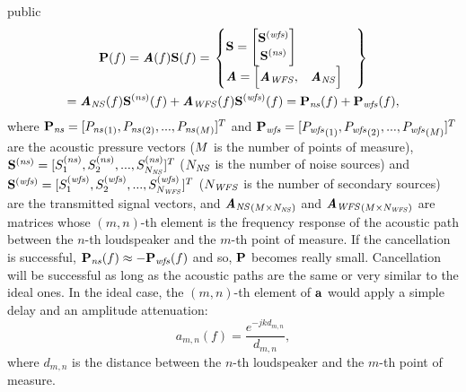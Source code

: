 \begin{shownto}{public}
\begin{multline}
	\Field[noValue][frequency][vector](f)
	= \AcPath[mat](f) \vec{\signal[nothing][frequency]}(f)
	= \left. \begin{cases}
		\vec{\signal[nothing][frequency]} = 
		\begin{bmatrix}
			\vec{\signal[wfs][frequency]} \\
			\vec{\signal[ns][frequency]}
		\end{bmatrix} \\
		\AcPath[mat] =
		\begin{bmatrix}
			\AcPath[mat][WFS], & \AcPath[mat][NS]
		\end{bmatrix}
	\end{cases} \right\} \\
	= \AcPath[mat][NS](f) \vec{\signal[ns][frequency]}(f) + \AcPath[mat][WFS](f) \vec{\signal[wfs][frequency]}(f)
	= \Field[ns][frequency][vector](f) + \Field[wfs][frequency][vector](f),
	\label{acPathModel}
\end{multline}
where $\Field[ns][frequency][vector] = [\Field[ns][frequency][scalar][1], \Field[ns][frequency][scalar][2], ..., \Field[ns][frequency][scalar][\numMeasPoints]]^T$ and $\Field[wfs][frequency][vector] = [\Field[wfs][frequency][scalar][1], \Field[wfs][frequency][scalar][2], ..., \Field[wfs][frequency][scalar][\numMeasPoints]]^T$ are the acoustic pressure vectors ($M$ is the number of points of measure), $\vec{\signal[ns][frequency]} = [\signal[ns][frequency]_1, \signal[ns][frequency]_2, ..., \signal[ns][frequency]_{\numNS}]^T$ ($N_\mathit{NS}$ is the number of noise sources) and $\vec{\signal[wfs][frequency]} = [\signal[wfs][frequency]_1, \signal[wfs][frequency]_2, ..., \signal[wfs][frequency]_{\numWFS}]^T$ ($N_\mathit{WFS}$ is the number of secondary sources) are the transmitted signal vectors, and ${\AcPath[mat][NS]}_{(\numMeasPoints \times \numNS)}$ and ${\AcPath[mat][WFS]}_{(\numMeasPoints \times \numWFS)}$ are matrices whose $(m,n)$-th element is the frequency response of the acoustic path between the $n$-th loudspeaker and the $m$-th point of measure. If the cancellation is successful, $\Field[ns][frequency][vector](f) \approx -\Field[wfs][frequency][vector](f)$ and so, $\Field[noValue][frequency][vector]$ becomes really small. Cancellation will be successful as long as the acoustic paths are the same or very similar to the ideal ones. In the ideal case, the $(m,n)$-th element of $\AcPath$ would apply a simple delay and an amplitude attenuation:
\begin{equation}
a_{m,n}(f) = \frac{e^{-j k d_{m,n}}}{d_{m,n}},
\end{equation}
where $d_{m,n}$ is the distance between the $n$-th loudspeaker and the $m$-th point of measure.
\end{shownto}

